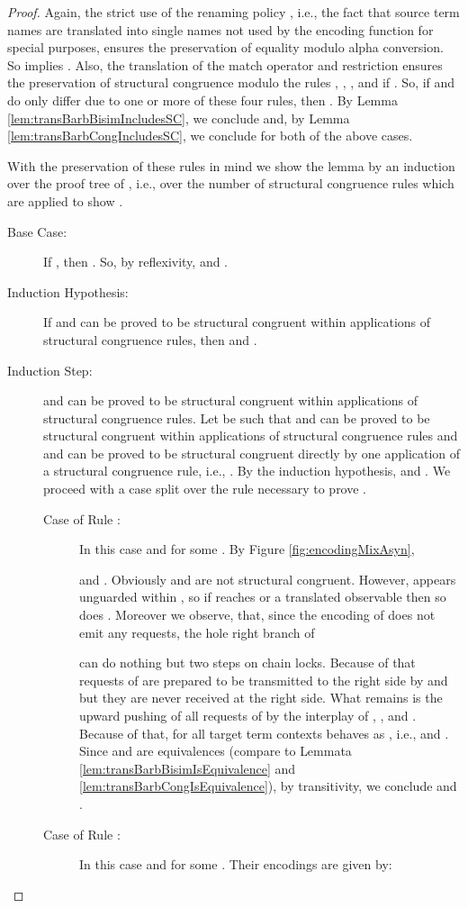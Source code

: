 \documentclass[]{llncs}
\begin{document}
\begin{proof}
	Again, the strict use of the renaming policy , i.e., the fact that source term names are translated into single names not used by the encoding function for special purposes, ensures the preservation of equality modulo alpha conversion. So  implies . Also, the \clean translation of the match operator and restriction ensures the preservation of structural congruence modulo the rules , , , and  if . So, if  and  do only differ due to one or more of these four rules, then . By Lemma \ref{lem:transBarbBisimIncludesSC}, we conclude  and, by Lemma \ref{lem:transBarbCongIncludesSC}, we conclude  for both of the above cases.
	
	With the preservation of these rules in mind we show the lemma by an induction over the proof tree of , i.e., over the number of structural congruence rules which are applied to show .
	\begin{description}
		\item[Base Case:] If , then . So, by reflexivity,  and .
		\item[Induction Hypothesis:] If  and  can be proved to be structural congruent within  applications of structural congruence rules, then  and .
		\item[Induction Step:]  and  can be proved to be structural congruent within  applications of structural congruence rules. Let  be such that  and  can be proved to be structural congruent within  applications of structural congruence rules and  and  can be proved to be structural congruent directly by one application of a structural congruence rule, i.e., . By the induction hypothesis,  and . We proceed with a case split over the rule necessary to prove .
		\begin{description}
			\item[Case of Rule :] In this case  and  for some . By Figure \ref{fig:encodingMixAsyn},
				
				and . Obviously  and  are not structural congruent. However,  appears unguarded within , so if  reaches  or a translated observable then so does . Moreover we observe, that, since the encoding of  does not emit any requests, the hole right branch of 
				
				can do nothing but two steps on chain locks. Because of that requests of  are prepared to be transmitted to the right side by  and  but they are never received at the right side. What remains is the upward pushing of all requests of  by the interplay of , , and . Because of that, for all target term contexts  behaves as , i.e.,  and . Since  and  are equivalences (compare to Lemmata \ref{lem:transBarbBisimIsEquivalence} and \ref{lem:transBarbCongIsEquivalence}), by transitivity, we conclude  and .
			\item[Case of Rule :] In this case  and  for some . Their encodings are given by:
				

\end{description}
\end{description}
\end{proof}
\end{document}
